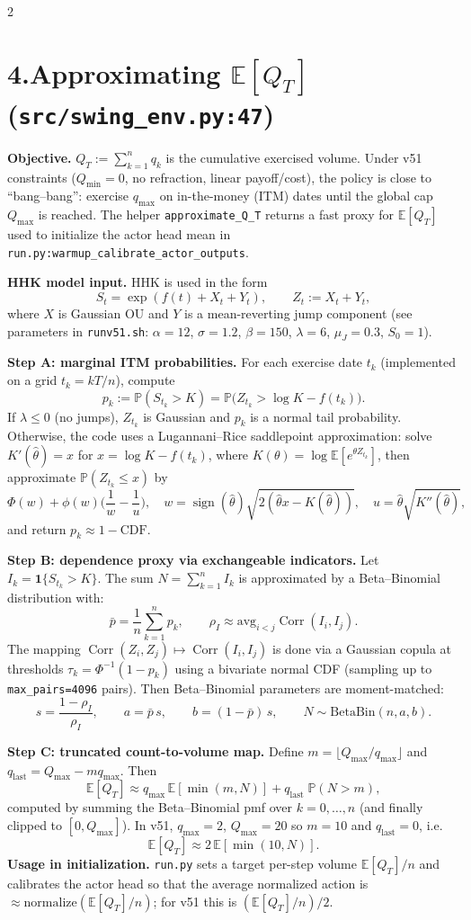 \documentclass[10pt]{article}
\newcommand{\code}[1]{\texttt{#1}}
\newcommand{\E}{\mathbb{E}}
\newcommand{\1}{\mathbf{1}}
\begin{document}
\begin{multicols}{2}
\section*{4.\;Approximating \texorpdfstring{$\E[Q_T]$}{E[Q\_T]} (\code{src/swing\_env.py:47})}
\textbf{Objective.} $Q_T:=\sum_{k=1}^n q_k$ is the cumulative exercised volume. Under v51 constraints ($Q_{\min}{=}0$, no refraction, linear payoff/cost), the policy is close to ``bang--bang'': exercise $q_{\max}$ on in-the-money (ITM) dates until the global cap $Q_{\max}$ is reached. The helper \code{approximate\_Q\_T} returns a fast proxy for $\E[Q_T]$ used to initialize the actor head mean in \code{run.py:warmup\_calibrate\_actor\_outputs}.

\textbf{HHK model input.} HHK is used in the form
\[
S_t=\exp(f(t)+X_t+Y_t),\qquad Z_t:=X_t+Y_t,
\]
where $X$ is Gaussian OU and $Y$ is a mean-reverting jump component (see parameters in \code{runv51.sh}: $\alpha{=}12$, $\sigma{=}1.2$, $\beta{=}150$, $\lambda{=}6$, $\mu_J{=}0.3$, $S_0{=}1$).

\textbf{Step A: marginal ITM probabilities.} For each exercise date $t_k$ (implemented on a grid $t_k=kT/n$), compute
\[
p_k := \mathbb{P}(S_{t_k}>K)=\mathbb{P}\!\big(Z_{t_k}>\log K - f(t_k)\big).
\]
If $\lambda\le 0$ (no jumps), $Z_{t_k}$ is Gaussian and $p_k$ is a normal tail probability. Otherwise, the code uses a Lugannani--Rice saddlepoint approximation: solve $K'( \hat\theta)=x$ for $x=\log K-f(t_k)$, where $K(\theta)=\log \E[e^{\theta Z_{t_k}}]$, then approximate $\mathbb{P}(Z_{t_k}\le x)$ by
\[
\Phi(w)+\phi(w)\Big(\frac1w-\frac1u\Big),\quad
w=\operatorname{sign}(\hat\theta)\sqrt{2(\hat\theta x-K(\hat\theta))},\quad
u=\hat\theta\sqrt{K''(\hat\theta)},
\]
and return $p_k\approx 1-\text{CDF}$.

\textbf{Step B: dependence proxy via exchangeable indicators.} Let $I_k=\1\{S_{t_k}>K\}$. The sum $N=\sum_{k=1}^n I_k$ is approximated by a Beta--Binomial distribution with:
\[
\bar p=\frac1n\sum_{k=1}^n p_k,
\qquad \rho_I \approx \text{avg}_{i<j}\operatorname{Corr}(I_i,I_j).
\]
The mapping $\operatorname{Corr}(Z_i,Z_j)\mapsto \operatorname{Corr}(I_i,I_j)$ is done via a Gaussian copula at thresholds $\tau_k=\Phi^{-1}(1-p_k)$ using a bivariate normal CDF (sampling up to \texttt{max\_pairs=4096} pairs).
Then Beta--Binomial parameters are moment-matched:
\[
s=\frac{1-\rho_I}{\rho_I},\qquad a=\bar p\,s,\qquad b=(1-\bar p)\,s,\qquad N\sim \text{BetaBin}(n,a,b).
\]

\textbf{Step C: truncated count-to-volume map.} Define $m=\lfloor Q_{\max}/q_{\max}\rfloor$ and $q_{\text{last}}=Q_{\max}-m q_{\max}$. Then
\[
\E[Q_T] \approx q_{\max}\,\E[\min(m,N)] + q_{\text{last}}\;\mathbb{P}(N>m),
\]
computed by summing the Beta--Binomial pmf over $k=0,\dots,n$ (and finally clipped to $[0,Q_{\max}]$). In v51, $q_{\max}{=}2$, $Q_{\max}{=}20$ so $m{=}10$ and $q_{\text{last}}{=}0$, i.e.
\[
\E[Q_T] \approx 2\,\E[\min(10,N)].
\]
\textbf{Usage in initialization.} \code{run.py} sets a target per-step volume $\E[Q_T]/n$ and calibrates the actor head so that the average normalized action is $\approx \text{normalize}(\E[Q_T]/n)$; for v51 this is $(\E[Q_T]/n)/2$.

\end{multicols}
\end{document}
